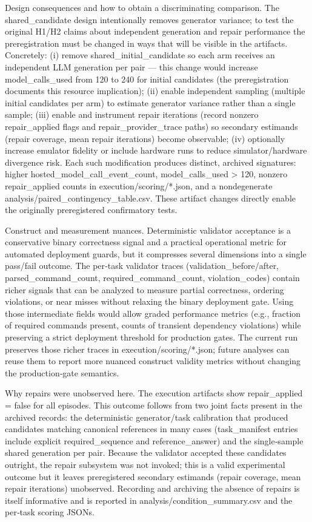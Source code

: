 \documentclass[conference]{IEEEtran}
\begin{document}
Design consequences and how to obtain a discriminating comparison. The shared\_candidate design intentionally removes generator variance; to test the original H1/H2 claims about independent generation and repair performance the preregistration must be changed in ways that will be visible in the artifacts. Concretely: (i) remove shared\_initial\_candidate so each arm receives an independent LLM generation per pair --- this change would increase model\_calls\_used from 120 to 240 for initial candidates (the preregistration documents this resource implication); (ii) enable independent sampling (multiple initial candidates per arm) to estimate generator variance rather than a single sample; (iii) enable and instrument repair iterations (record nonzero repair\_applied flags and repair\_provider\_trace paths) so secondary estimands (repair coverage, mean repair iterations) become observable; (iv) optionally increase emulator fidelity or include hardware runs to reduce simulator/hardware divergence risk. Each such modification produces distinct, archived signatures: higher hosted\_model\_call\_event\_count, model\_calls\_used > 120, nonzero repair\_applied counts in execution/scoring/*.json, and a nondegenerate analysis/paired\_contingency\_table.csv. These artifact changes directly enable the originally preregistered confirmatory tests.

Construct and measurement nuances. Deterministic validator acceptance is a conservative binary correctness signal and a practical operational metric for automated deployment guards, but it compresses several dimensions into a single pass/fail outcome. The per‑task validator traces (validation\_before/after, parsed\_command\_count, required\_command\_count, violation\_codes) contain richer signals that can be analyzed to measure partial correctness, ordering violations, or near misses without relaxing the binary deployment gate. Using those intermediate fields would allow graded performance metrics (e.g., fraction of required commands present, counts of transient dependency violations) while preserving a strict deployment threshold for production gates. The current run preserves those richer traces in execution/scoring/*.json; future analyses can reuse them to report more nuanced construct validity metrics without changing the production‑gate semantics.

Why repairs were unobserved here. The execution artifacts show repair\_applied = false for all episodes. This outcome follows from two joint facts present in the archived records: the deterministic generator/task calibration that produced candidates matching canonical references in many cases (task\_manifest entries include explicit required\_sequence and reference\_answer) and the single‑sample shared generation per pair. Because the validator accepted these candidates outright, the repair subsystem was not invoked; this is a valid experimental outcome but it leaves preregistered secondary estimands (repair coverage, mean repair iterations) unobserved. Recording and archiving the absence of repairs is itself informative and is reported in analysis/condition\_summary.csv and the per‑task scoring JSONs.
\end{document}
